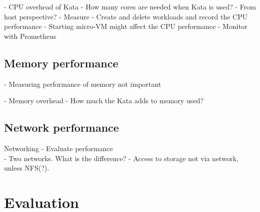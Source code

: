 - CPU overhead of Kata
	- How many cores are needed when Kata is used?
	- From host perspective?
	- Measure
		- Create and delete workloads and record the CPU performance
			- Starting micro-VM might affect the CPU performance
			- Monitor with Prometheus

\subsection{Memory performance}

- Measuring performance of memory not important

- Memory overhead
	- How much the Kata adds to memory used?

\subsection{Network performance}

Networking
    - Evaluate performance \\
    - Two networks. What is the difference?
    - Access to storage not via network, unless NFS(?).

\section{Evaluation}